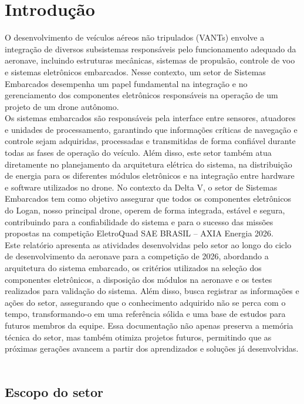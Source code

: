 \section{Introdução}
\label{sec:introducao}

O desenvolvimento de veículos aéreos não tripulados (VANTs) envolve a integração de diversos subsistemas responsáveis pelo funcionamento adequado da aeronave, incluindo estruturas mecânicas, sistemas de propulsão, controle de voo e sistemas eletrônicos embarcados. Nesse contexto, um setor de Sistemas Embarcados desempenha um papel fundamental na integração e no gerenciamento dos componentes eletrônicos responsáveis na operação de um projeto de um drone autônomo. \\
Os sistemas embarcados são responsáveis pela interface entre sensores, atuadores e unidades de processamento, garantindo que informações críticas de navegação e controle sejam adquiridas, processadas e transmitidas de forma confiável durante todas as fases de operação do veículo. Além disso, este setor também atua diretamente no planejamento da arquitetura elétrica do sistema, na distribuição de energia para os diferentes módulos eletrônicos e na integração entre hardware e software utilizados no drone. No contexto da Delta V, o setor de Sistemas Embarcados tem como objetivo assegurar que todos os componentes eletrônicos do Logan, nosso principal drone, operem de forma integrada, estável e segura, contribuindo para a confiabilidade do sistema e para o sucesso das missões propostas na competição EletroQuad SAE BRASIL – AXIA Energia 2026.\\ 
Este relatório apresenta as atividades desenvolvidas pelo setor ao longo do ciclo de desenvolvimento da aeronave para a competição de 2026, abordando a arquitetura do sistema embarcado, os critérios utilizados na seleção dos componentes eletrônicos, a disposição dos módulos na aeronave e os testes realizados para validação do sistema. Além disso, busca registrar as informações e ações do setor, assegurando que o conhecimento adquirido não se perca com o tempo, transformando-o em uma referência sólida e uma base de estudos para futuros membros da equipe. Essa documentação não apenas preserva a memória técnica do setor, mas também otimiza projetos futuros, permitindo que as próximas gerações avancem a partir dos aprendizados e soluções já desenvolvidas. \\\

\subsection{Escopo do setor}
